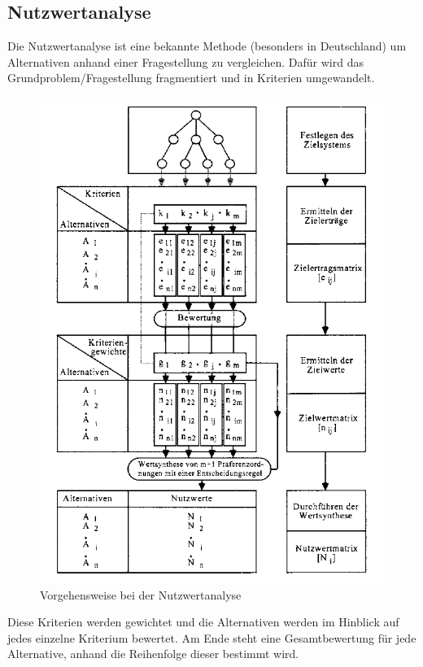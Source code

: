 \subsection{Nutzwertanalyse}
Die Nutzwertanalyse ist eine bekannte Methode (besonders in Deutschland) um Alternativen anhand einer Fragestellung zu vergleichen. Dafür wird das Grundproblem/Fragestellung fragmentiert und in Kriterien umgewandelt. 
\begin{figure}[h!]
	\centering
	\includegraphics[scale = 0.7]{img/NUTZ.png}
	\caption{Vorgehensweise bei der Nutzwertanalyse}
	\label{img:nutz}
\end{figure}
Diese Kriterien werden gewichtet und die Alternativen werden im Hinblick auf jedes einzelne Kriterium bewertet. Am Ende steht eine Gesamtbewertung für jede Alternative, anhand die Reihenfolge dieser bestimmt wird.\\
